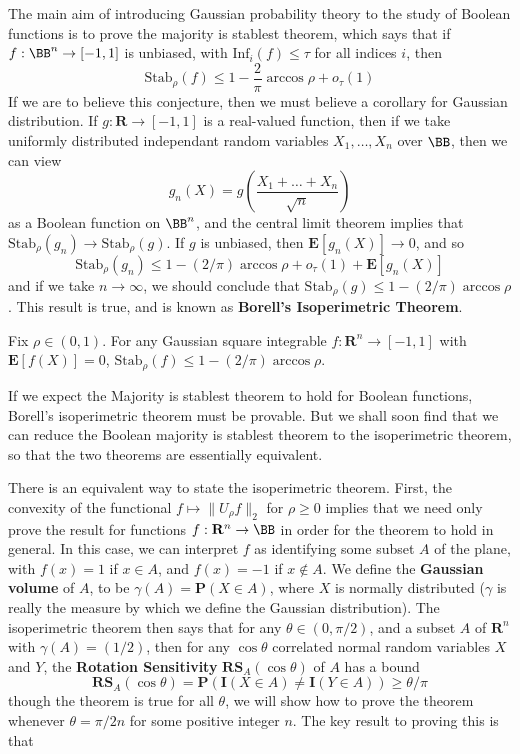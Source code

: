 The main aim of introducing Gaussian probability theory to the study of Boolean functions is to prove the majority is stablest theorem, which says that if $f: \BB^n \to [-1,1]$ is unbiased, with $\text{Inf}_i(f) \leq \tau$ for all indices $i$, then
%
\[ \text{Stab}_\rho(f) \leq 1 - \frac{2}{\pi} \arccos \rho + o_\tau(1) \]
%
If we are to believe this conjecture, then we must believe a corollary for Gaussian distribution. If $g: \mathbf{R} \to [-1,1]$ is a real-valued function, then if we take uniformly distributed independant random variables $X_1, \dots, X_n$ over $\BB$, then we can view
%
\[ g_n(X) = g \left( \frac{X_1 + \dots + X_n}{\sqrt{n}} \right) \]
%
as a Boolean function on $\BB^n$, and the central limit theorem implies that $\text{Stab}_\rho(g_n) \to \text{Stab}_\rho(g)$. If $g$ is unbiased, then $\mathbf{E}[g_n(X)] \to 0$, and so
%
\[ \text{Stab}_\rho(g_n) \leq 1 - (2/\pi) \arccos \rho + o_\tau(1) + \mathbf{E}[g_n(X)] \]
%
and if we take $n \to \infty$, we should conclude that $\text{Stab}_\rho(g) \leq 1 - (2/\pi) \arccos \rho$. This result is true, and is known as {\bf Borell's Isoperimetric Theorem}.

\begin{theorem}
    Fix $\rho \in (0,1)$. For any Gaussian square integrable $f: \mathbf{R}^n \to [-1,1]$ with $\mathbf{E}[f(X)] = 0$, $\text{Stab}_\rho(f) \leq 1 - (2/\pi) \arccos \rho$.
\end{theorem}

If we expect the Majority is stablest theorem to hold for Boolean functions, Borell's isoperimetric theorem must be provable. But we shall soon find that we can reduce the Boolean majority is stablest theorem to the isoperimetric theorem, so that the two theorems are essentially equivalent.

There is an equivalent way to state the isoperimetric theorem. First, the convexity of the functional $f \mapsto \| U_\rho f \|_2$ for $\rho \geq 0$ implies that we need only prove the result for functions $f: \mathbf{R}^n \to \BB$ in order for the theorem to hold in general. In this case, we can interpret $f$ as identifying some subset $A$ of the plane, with $f(x) = 1$ if $x \in A$, and $f(x) = -1$ if $x \not \in A$. We define the {\bf Gaussian volume} of $A$, to be $\gamma(A) = \mathbf{P}(X \in A)$, where $X$ is normally distributed ($\gamma$ is really the measure by which we define the Gaussian distribution). The isoperimetric theorem then says that for any $\theta \in (0,\pi/2)$, and a subset $A$ of $\mathbf{R}^n$ with $\gamma(A) = (1/2)$, then for any $\cos \theta$ correlated normal random variables $X$ and $Y$, the {\bf Rotation Sensitivity} $\mathbf{RS}_A(\cos \theta)$ of $A$ has a bound
%
\[ \mathbf{RS}_A(\cos \theta) = \mathbf{P}(\mathbf{I}(X \in A) \neq \mathbf{I}(Y \in A)) \geq \theta / \pi \]
%
though the theorem is true for all $\theta$, we will show how to prove the theorem whenever $\theta = \pi/2n$ for some positive integer $n$. The key result to proving this is that

